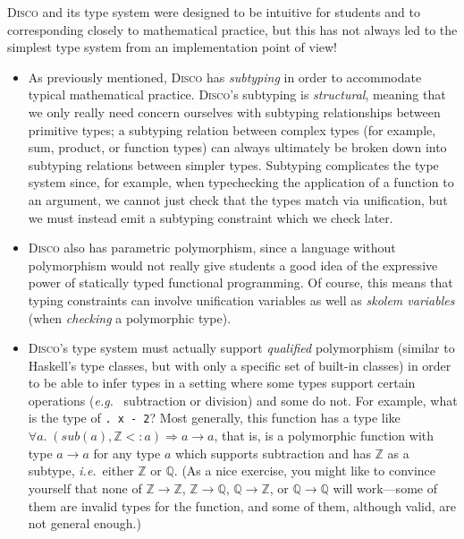 \documentclass[copyright,creativecommons]{eptcs}
\newcommand{\disco}{\textsc{Disco}\xspace}
\newcommand{\ie}{\emph{i.e.}\ }
\newcommand{\eg}{\emph{e.g.}\ }
\newcommand{\Z}{\mathbb{Z}}
\newcommand{\Q}{\mathbb{Q}}
\begin{document}
\disco and its type system were designed to be intuitive for students
and to corresponding closely to mathematical practice, but this has
not always led to the simplest type system from an implementation
point of view!

\begin{itemize}
\item As previously mentioned, \disco has \emph{subtyping} in order to
  accommodate typical mathematical practice.  \disco's subtyping is
  \emph{structural}, meaning that we only really need concern
  ourselves with subtyping relationships between primitive types; a
  subtyping relation between complex types (for example, sum, product,
  or function types) can always ultimately be broken down into
  subtyping relations between simpler types.  Subtyping complicates
  the type system since, for example, when typechecking the
  application of a function to an argument, we cannot just check that
  the types match via unification, but we must instead emit a
  subtyping constraint which we check later.

\item \disco also has parametric polymorphism, since a language
  without polymorphism would not really give students a good idea of
  the expressive power of statically typed functional programming.  Of
  course, this means that typing constraints can involve unification
  variables as well as \emph{skolem variables} (when \emph{checking} a
  polymorphic type).

\item \disco's type system must actually support \emph{qualified}
  polymorphism (similar to Haskell's type classes, but with only a
  specific set of built-in classes) in order to be able to infer types
  in a setting where some types support certain operations (\eg
  subtraction or division) and some do not.  For example, what is the
  type of \texttt{\x. x - 2}?  Most generally, this function
  has a type like
  $\forall a.\; (\textit{sub}(a), \Z <: a) \Rightarrow a \to a$, that
  is, is a polymorphic function with type $a \to a$ for any type $a$
  which supports subtraction and has $\Z$ as a subtype, \ie either
  $\Z$ or $\Q$.  (As a nice exercise, you might like to convince
  yourself that none of $\Z \to \Z$, $\Z \to \Q$, $\Q \to \Z$, or $\Q
  \to \Q$ will work---some of them are invalid types for the function,
  and some of them, although valid, are not general enough.)


\end{itemize}
\end{document}
